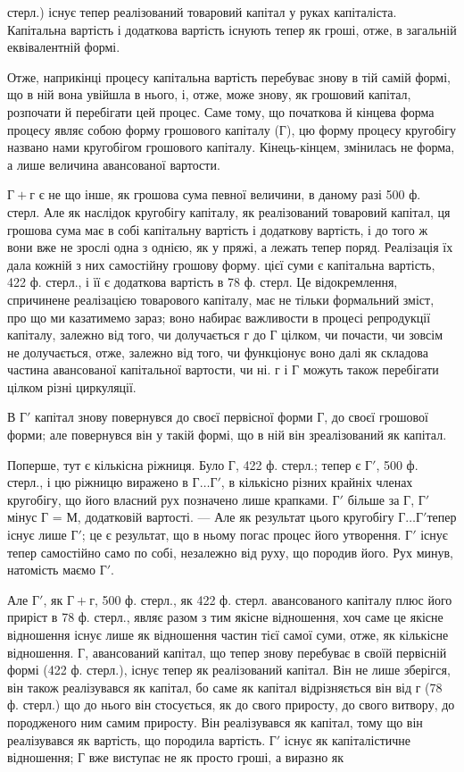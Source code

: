 \parcont{}  %
стерл.) існує тепер реалізований товаровий капітал у руках капіталіста.
Капітальна вартість і додаткова вартість існують тепер як гроші,
отже, в загальній еквівалентній формі.

Отже, наприкінці процесу капітальна вартість перебуває знову
в тій самій формі, що в ній вона увійшла в нього, і, отже, може знову,
як грошовий капітал, розпочати й перебігати цей процес. Саме тому, що
початкова й кінцева форма процесу являє собою форму грошового капіталу
(Г), цю форму процесу кругобігу названо нами кругобігом
грошового капіталу. Кінець-кінцем, змінилась не форма, а лише величина
авансованої вартости.

$Г + г$ є не що інше, як грошова сума певної величини, в даному разі
500 ф. стерл. Але як наслідок кругобігу капіталу, як реалізований
товаровий капітал, ця грошова сума має в собі капітальну вартість
і додаткову вартість, і до того ж вони вже не зрослі одна з однією, як
у пряжі, а лежать тепер поряд. Реалізація їх дала кожній з них самостійну
грошову форму.  цієї суми є капітальна вартість, 422 ф.
стерл., і  її є додаткова вартість в 78 ф. стерл. Це відокремлення,
спричинене реалізацією товарового капіталу, має не тільки формальний
зміст, про що ми казатимемо зараз; воно набирає важливости в процесі
репродукції капіталу, залежно від того, чи долучається г до Г цілком, чи
почасти, чи зовсім не долучається, отже, залежно від того, чи функціонує
воно далі як складова частина авансованої капітальної вартости, чи ні.
г і Г можуть також перебігати цілком різні циркуляції.

В $Г'$ капітал знову повернувся до своєї первісної форми Г, до своєї
грошової форми; але повернувся він у такій формі, що в ній він зреалізований
як капітал.

Поперше, тут є кількісна ріжниця. Було Г, 422 ф. стерл.; тепер є $Г'$,
500 ф. стерл., і цю ріжницю виражено в $Г\dots{} Г'$, в кількісно різних
крайніх членах кругобігу, що його власний рух позначено лише крапками.
$Г'$ більше за Г, $Г'$ мінус Г = М, додатковій вартості. — Але як результат цього
кругобігу $Г\dots{} Г' т$епер існує лише $Г'$; це є результат, що в ньому погас
процес його утворення. $Г'$ існує тепер самостійно само по собі, незалежно
від руху, що породив його. Рух минув, натомість маємо $Г'$.

Але $Г'$, як $Г + г$, 500 ф. стерл., як 422 ф. стерл. авансованого капіталу
плюс його приріст в 78 ф. стерл., являє разом з тим якісне відношення,
хоч саме це якісне відношення існує лише як відношення частин тієї
самої суми, отже, як кількісне відношення. Г, авансований капітал, що
тепер знову перебуває в своїй первісній формі (422 ф. стерл.), існує
тепер як реалізований капітал. Він не лише зберігся, він також реалізувався
як капітал, бо саме як капітал відрізняється він від г (78 ф. стерл.)
що до нього він стосується, як до свого приросту, до свого витвору, до
породженого ним самим приросту. Він реалізувався як капітал, тому що
він реалізувався як вартість, що породила вартість. $Г'$ існує як капіталістичне
відношення; Г вже виступає не як просто гроші, а виразно як
\parbreak{}  %
